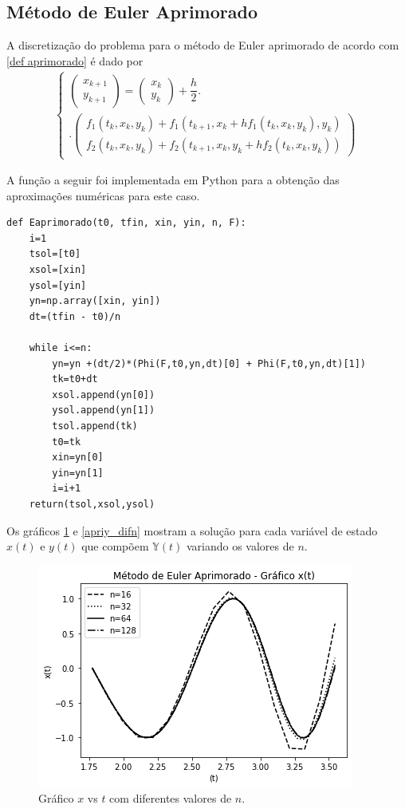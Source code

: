 \documentclass[amsmath,amssymb,floatfix]{revtex4}
\begin{document}
\subsection{Método de Euler Aprimorado}
A discretização do problema para o método de Euler aprimorado de acordo com \eqref{def aprimorado} é dado por 
\begin{eqnarray}\label{Aprimorado}
\begin{cases}
\begin{pmatrix}  x_{k+1} \\ y_{k+1} \end{pmatrix}
 = \begin{pmatrix} x_k\\ y_k \end{pmatrix}
 +\dfrac{h}{2}.\\
 .\begin{pmatrix} f_1(t_k,x_k,y_k)+f_1(t_{k+1},x_k + hf_1(t_k,x_k,y_k),y_k) \\ f_2(t_k,x_k,y_k)+f_2(t_{k+1},x_k,y_k + hf_2(t_k,x_k,y_k))
 \end{pmatrix}
 \end{cases}
 \end{eqnarray}
 
A função a seguir foi implementada em Python para a obtenção das aproximações numéricas para este caso.
\begin{lstlisting}
def Eaprimorado(t0, tfin, xin, yin, n, F):
    i=1
    tsol=[t0]
    xsol=[xin]
    ysol=[yin]
    yn=np.array([xin, yin])
    dt=(tfin - t0)/n

    while i<=n:
        yn=yn +(dt/2)*(Phi(F,t0,yn,dt)[0] + Phi(F,t0,yn,dt)[1])
        tk=t0+dt
        xsol.append(yn[0])
        ysol.append(yn[1])
        tsol.append(tk)
        t0=tk
        xin=yn[0]
        yin=yn[1]
        i=i+1
    return(tsol,xsol,ysol)  
\end{lstlisting}

Os gráficos \ref{aprix_difn} e \ref{apriy_difn} mostram a solução para cada variável de estado $x(t)$ e $y(t)$ que compõem $\mathbb{Y}(t)$ variando os valores de $n$.
\begin{figure}[H]
\centering
\includegraphics[scale=0.56]{aprix_diferentesn}
\caption{Gráfico $x$ vs $t$ com diferentes valores de $n$.}
\label{aprix_difn}
\end{figure}
\end{document}

